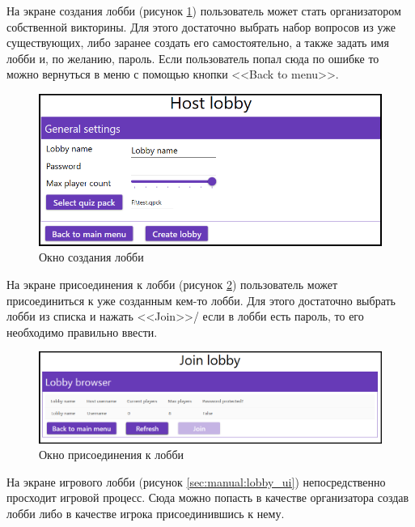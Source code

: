 На экране создания лобби (рисунок \ref{sec:manual:host_ui}) пользователь может стать организатором собственной викторины. Для этого достаточно выбрать набор вопросов из 
уже существующих, либо заранее создать его самостоятельно, а также задать имя лобби и, по желанию, пароль. Если пользователь попал сюда по ошибке то можно вернуться в меню с
помощью кнопки <<Back to menu>>.

\begin{figure}[!ht]
    \centering
    \includegraphics[scale=0.7]{attachments/host_ui.png}
    \caption{Окно создания лобби}
    \label{sec:manual:host_ui}
\end{figure}

На экране присоединения к лобби (рисунок \ref{sec:manual:join_ui}) пользователь может присоединиться к уже созданным кем-то лобби. Для этого достаточно выбрать лобби из списка 
и нажать <<Join>>/ если в лобби есть пароль, то его необходимо правильно ввести.

\begin{figure}[!ht]
    \centering
    \includegraphics[scale=0.6]{attachments/join_ui.png}
    \caption{Окно присоединения к лобби}
    \label{sec:manual:join_ui}
\end{figure}

На экране игрового лобби (рисунок \ref{sec:manual:lobby_ui}) непосредственно просходит игровой процесс. Сюда можно попасть в качестве организатора создав лобби либо в качестве игрока присоединившись к нему.

